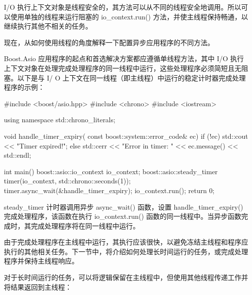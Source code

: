 

I/O 执行上下文对象是线程安全的，其方法可以从不同的线程安全地调用。所以可以使用单独的线程来运行阻塞的 io\_context.run() 方法，并使主线程保持畅通，以继续执行其他不相关的任务。

现在，从如何使用线程的角度解释一下配置异步应用程序的不同方法。


Boost.Asio 应用程序的起点和首选解决方案都应遵循单线程方法，其中 I/O 执行上下文对象在处理完成处理程序的同一线程中运行，这些处理程序必须简短且无阻塞。以下是与 I/ O 上下文在同一线程（即主线程）中运行的稳定计时器完成处理程序的示例：

\begin{cpp}
#include <boost/asio.hpp>
#include <chrono>
#include <iostream>

using namespace std::chrono_literals;

void handle_timer_expiry(
            const boost::system::error_code& ec) {
    if (!ec) {
        std::cout << "Timer expired!\n";
    } else {
        std::cerr << "Error in timer: "
                  << ec.message() << std::endl;
    }
}

int main() {
    boost::asio::io_context io_context;
    boost::asio::steady_timer timer(io_context,
                              std::chrono::seconds(1));
    timer.async_wait(&handle_timer_expiry);
    io_context.run();
    return 0;
}
\end{cpp}

steady\_timer 计时器调用异步 async\_wait() 函数，设置 handle\_timer\_expiry() 完成处理程序，该函数在执行 io\_context.run() 函数的同一线程中。当异步函数完成时，其完成处理程序将在同一线程中运行。

由于完成处理程序在主线程中运行，其执行应该很快，以避免冻结主线程和程序应执行的其他相关任务。下一节中，将介绍如何处理长时间运行的任务，或完成处理程序并保持主线程响应。


对于长时间运行的任务，可以将逻辑保留在主线程中，但使用其他线程传递工作并将结果返回到主线程：

